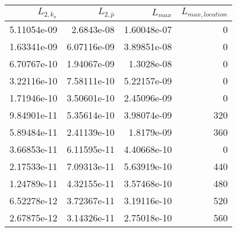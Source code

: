 \begin{tabular}{rrrr}
\toprule
$L_{2,{k_x}}$ & $L_{2,\bar{p}}$ & $L_{max}$ & $L_{max,location}$ \\
\midrule
5.11054e-09 & 2.6843e-08 & 1.60048e-07 & 0 \\
1.63341e-09 & 6.07116e-09 & 3.89851e-08 & 0 \\
6.70767e-10 & 1.94067e-09 & 1.3028e-08 & 0 \\
3.22116e-10 & 7.58111e-10 & 5.22157e-09 & 0 \\
1.71946e-10 & 3.50601e-10 & 2.45096e-09 & 0 \\
9.84901e-11 & 5.35614e-10 & 3.98074e-09 & 320 \\
5.89484e-11 & 2.41139e-10 & 1.8179e-09 & 360 \\
3.66853e-11 & 6.11595e-11 & 4.40668e-10 & 0 \\
2.17533e-11 & 7.09313e-11 & 5.63919e-10 & 440 \\
1.24789e-11 & 4.32155e-11 & 3.57468e-10 & 480 \\
6.52278e-12 & 3.72367e-11 & 3.19116e-10 & 520 \\
2.67875e-12 & 3.14326e-11 & 2.75018e-10 & 560 \\
\bottomrule
\end{tabular}
